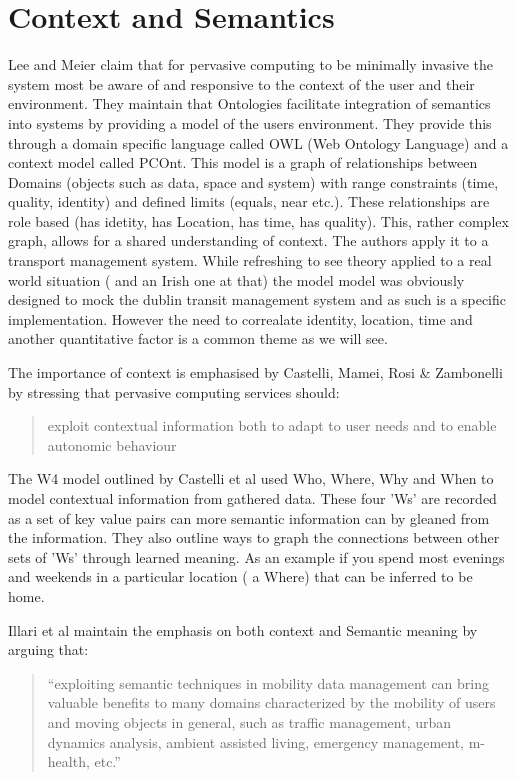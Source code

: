 \documentclass[]{report}
\begin{document}
\section*{Context and Semantics}
Lee and Meier\cite{0} claim that for pervasive computing to be minimally invasive the system most be aware of and responsive to the context of the user and their environment. They maintain that Ontologies facilitate integration of semantics into systems by providing a model of the users environment. They provide this through a domain specific language called OWL (Web Ontology Language) and a context model called PCOnt. This model is a graph of relationships between Domains (objects such as data, space and system) with range constraints (time, quality, identity) and defined limits (equals, near etc.). These relationships are role based (has idetity, has Location, has time, has quality). This, rather complex graph, allows for a shared understanding of context. The authors apply it to a transport management system. While refreshing to see theory applied to a real world situation ( and an Irish one at that) the model model was obviously designed to mock the dublin transit management system and as such is a specific implementation. However the need to correalate identity, location, time and another quantitative factor is a common theme as we will see.\par
%
The importance of context is emphasised by Castelli, Mamei, Rosi \& Zambonelli\cite{2} by stressing that  pervasive computing services should:
\begin{quote}
exploit contextual information both to adapt to user needs and to enable autonomic behaviour\cite{2}
\end{quote} 

The W4 model outlined by Castelli et al used Who, Where, Why and When to model contextual information from gathered data. These four 'Ws' are recorded as a set of key value pairs can more semantic information can by gleaned from the information. They also outline ways to graph the connections between other sets of 'Ws' through learned meaning. As an example if you spend most evenings and weekends in a particular location ( a Where) that can be inferred to be home.\par
%
Illari et al\cite{3} maintain the emphasis on both context and Semantic meaning by arguing that:
\begin{quote}
``exploiting semantic techniques in mobility data management can bring valuable benefits to many domains characterized by the mobility of users and moving objects in general, such as traffic management, urban dynamics analysis, ambient assisted living, emergency management, m-health, etc.''\cite{3}
\end{quote}\par
\end{document}

